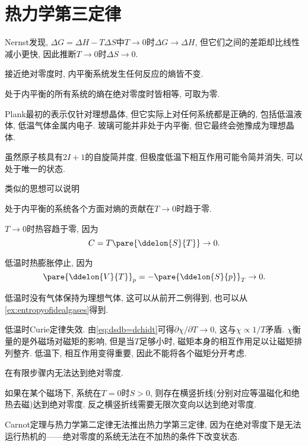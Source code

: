 \documentclass[../Thermal.tex]{subfiles}
\begin{document}
\section{热力学第三定律}
Nernst发现, $\Delta G = \Delta H - T\Delta S$中$T\rightarrow 0$时$\Delta G\rightarrow \Delta H$, 但它们之间的差距却比线性减小更快, 因此推断$T\rightarrow 0$时$\Delta S\rightarrow 0$.
\begin{finale}
\begin{axiom}[热力学第三定律]
接近绝对零度时, 内平衡系统发生任何反应的熵皆不变.
\end{axiom}
\end{finale}
\begin{corollary}[热力学第三定律]
处于内平衡的所有系统的熵在绝对零度时皆相等, 可取为零.
\end{corollary}
Plank最初的表示仅针对理想晶体, 但它实际上对任何系统都是正确的, 包括低温液体, 低温气体金属内电子. 玻璃可能并非处于内平衡, 但它最终会弛豫成为理想晶体.
\begin{remark}
虽然原子核具有$2I+1$的自旋简并度, 但极度低温下相互作用可能令简并消失, 可以处于唯一的状态.
\end{remark}
类似的思想可以说明
\begin{corollary}[热力学第三定律]
处于内平衡的系统各个方面对熵的贡献在$T\rightarrow 0$时趋于零.
\end{corollary}
\begin{ex}
$T\rightarrow 0$时热容趋于零, 因为
\[ C = T\pare{\ddelon{S}{T}}\rightarrow 0. \]
\end{ex}
\begin{ex}
低温时热膨胀停止, 因为
\[ \pare{\ddelon{V}{T}}_p = -\pare{\ddelon{S}{p}}_T\rightarrow 0. \]
\end{ex}
\begin{ex}
低温时没有气体保持为理想气体, 这可以从前开二例得到, 也可以从\cref{ex:entropyofidealgases}得到.
\end{ex}
\begin{ex}
低温时Curie定律失效. 由\eqref{eq:dsdb=dchidt}可得$\partial \chi/\partial T\rightarrow 0$, 这与$\chi\propto 1/T$矛盾. $\chi$衡量的是外磁场对磁矩的影响, 但是当$T$足够小时, 磁矩本身的相互作用足以让磁矩排列整齐. 低温下, 相互作用变得重要, 因此不能将各个磁矩分开考虑.
\end{ex}
\begin{finale}
\begin{corollary}[热力学第三定律]
在有限步骤内无法达到绝对零度.
\end{corollary}
\end{finale}
\begin{ex}
如果在某个磁场下, 系统在$T = 0$时$S>0$, 则存在横竖折线(分别对应等温磁化和绝热去磁)达到绝对零度. 反之横竖折线需要无限次变向以达到绝对零度.
\end{ex}
\begin{remark}
Carnot定理与热力学第二定律无法推出热力学第三定律, 因为在绝对零度下是无法运行热机的——绝对零度的系统无法在不加热的条件下改变状态.
\end{remark}
\end{document}
